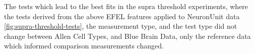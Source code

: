 The tests which lead to the best fits in the supra threshold experiments, where the tests derived from the above EFEL features applied to NeuronUnit data \ref{fig:supra-threshold-tests}, the measurement type, and the test type did not change between Allen Cell Types, and Blue Brain Data, only the reference data which informed comparison measurements changed.

